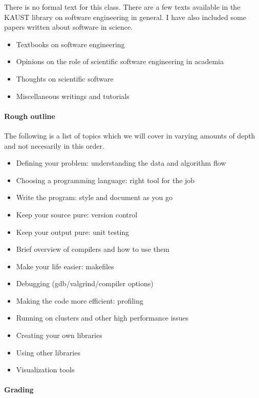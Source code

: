 \documentclass[12 pt]{article}
\begin{document}
There is no formal text for this class. There are a few texts
available in the KAUST library on software engineering in general. I
have also included some papers written about software in science.

\begin{itemize}
\item Textbooks on software engineering \cite{Sommerville2011,Nanz2011}
\item Opinions on the role of scientific software engineering in academia \cite{Todorov2012,Dirk2012}
\item Thoughts on scientific software \cite{Katzgraber2010,Hannay2009,Smith2007,Barnes2010}
\item Miscellaneous writings and tutorials \cite{make,Prentice1998,Gube2011,Spolsky2012}
\end{itemize}

\paragraph{Rough outline}

The following is a list of topics which we will cover in varying
amounts of depth and not necesarily in this order.
\begin{itemize}
\item Defining your problem: understanding the data and algorithm flow
\item Choosing a programming language: right tool for the job
\item Write the program: style and document as you go
\item Keep your source pure: version control
\item Keep your output pure: unit testing
\item Brief overview of compilers and how to use them
\item Make your life easier: makefiles
\item Debugging (gdb/valgrind/compiler options)
\item Making the code more efficient: profiling
\item Running on clusters and other high performance issues
\item Creating your own libraries
\item Using other libraries
\item Visualization tools
\end{itemize}

\paragraph{Grading}
\end{document}
